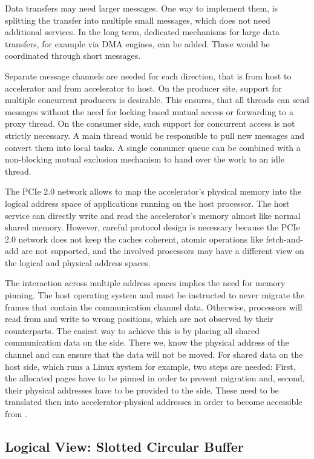 Data transfers may need larger messages. One way to implement them, is splitting
the transfer into multiple small messages, which does not need additional
services. In the long term, dedicated mechanisms for large data transfers, for
example via DMA engines, can be added. These would be coordinated through short
messages.

Separate message channels are needed for each direction, that is from host to
accelerator and from accelerator to host. On the producer site, support for
multiple concurrent producers is desirable. This ensures, that all threads can
send messages without the need for locking based mutual access or forwarding to
a proxy thread. On the consumer side, such support for concurrent access is not
strictly necessary. A main thread would be responsible to pull new messages and
convert them into local tasks. A single consumer queue can be combined with a
non-blocking mutual exclusion mechanism to hand over the work to an idle thread.

The PCIe 2.0 network allows to map the accelerator's physical memory into the
logical address space of applications running on the host processor. The host
service can directly write and read the accelerator's memory almost like normal
shared memory. However, careful protocol design is necessary because the PCIe
2.0 network does not keep the caches coherent, atomic operations like
fetch-and-add are not supported, and the involved processors may have a
different view on the logical and physical address spaces.

The interaction across multiple address spaces implies the need for memory
pinning. The host operating system and \mythos must be instructed to never
migrate the frames that contain the communication channel data. Otherwise,
processors will read from and write to wrong positions, which are not observed
by their counterparts. The easiest way to achieve this is by placing all shared
communication data on the \mythos side. There we, know the physical address of
the channel and can ensure that the data will not be moved. For shared data on
the host side, which runs a Linux system for example, two steps are needed:
First, the allocated pages have to be pinned in order to prevent migration and,
second, their physical addresses have to be provided to the \mythos side. These
need to be translated then into accelerator-physical addresses in order to
become accessible from \mythos.

\subsection{Logical View: Slotted Circular Buffer}


